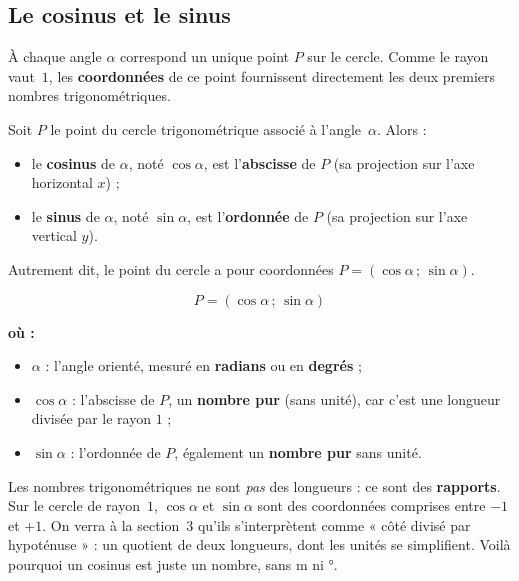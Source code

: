 \documentclass[11pt,a4paper]{article}
\newenvironment{ou}{%
  \par\smallskip\noindent\textbf{où :}\nopagebreak
  \begin{itemize}[leftmargin=1.8em,topsep=2pt,itemsep=1.5pt,parsep=0pt]}%
  {\end{itemize}}
\begin{document}
\subsection{Le cosinus et le sinus}
À chaque angle $\alpha$ correspond un unique point $P$ sur le cercle. Comme le rayon vaut~$1$, les
\textbf{coordonnées} de ce point fournissent directement les deux premiers nombres trigonométriques.

\begin{definition}
Soit $P$ le point du cercle trigonométrique associé à l'angle~$\alpha$. Alors :
\begin{itemize}[leftmargin=1.5em,topsep=2pt,itemsep=2pt]
  \item le \textbf{cosinus} de $\alpha$, noté $\cos\alpha$, est l'\textbf{abscisse} de $P$
        (sa projection sur l'axe horizontal $x$) ;
  \item le \textbf{sinus} de $\alpha$, noté $\sin\alpha$, est l'\textbf{ordonnée} de $P$
        (sa projection sur l'axe vertical $y$).
\end{itemize}
Autrement dit, le point du cercle a pour coordonnées $P=(\cos\alpha\,;\,\sin\alpha)$.
\end{definition}

\begin{formule}
\[
\boxed{\,P = (\cos\alpha\,;\,\sin\alpha)\,}
\]
\begin{ou}
  \item $\alpha$ : l'angle orienté, mesuré en \textbf{radians} ou en \textbf{degrés} ;
  \item $\cos\alpha$ : l'abscisse de $P$, un \textbf{nombre pur} (sans unité), car c'est une
        longueur divisée par le rayon $1$ ;
  \item $\sin\alpha$ : l'ordonnée de $P$, également un \textbf{nombre pur} sans unité.
\end{ou}
\end{formule}

\begin{remarque}
Les nombres trigonométriques ne sont \emph{pas} des longueurs : ce sont des \textbf{rapports}.
Sur le cercle de rayon~$1$, $\cos\alpha$ et $\sin\alpha$ sont des coordonnées comprises entre
$-1$ et $+1$. On verra à la section~3 qu'ils s'interprètent comme « côté divisé par hypoténuse » :
un quotient de deux longueurs, dont les unités se simplifient. Voilà pourquoi un cosinus est juste
un nombre, sans \si{\metre} ni \si{\degree}.
\end{remarque}
\end{document}
